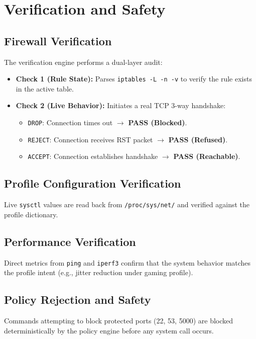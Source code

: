 \documentclass[11pt,a4paper]{article}
\begin{document}
\section{Verification and Safety}

\subsection{Firewall Verification}
The verification engine performs a dual-layer audit:
\begin{itemize}
    \item \textbf{Check 1 (Rule State):} Parses \texttt{iptables -L -n -v} to verify the rule exists in the active table.
    \item \textbf{Check 2 (Live Behavior):} Initiates a real TCP 3-way handshake:
    \begin{itemize}
        \item \texttt{DROP}: Connection times out $\rightarrow$ \textbf{PASS (Blocked)}.
        \item \texttt{REJECT}: Connection receives RST packet $\rightarrow$ \textbf{PASS (Refused)}.
        \item \texttt{ACCEPT}: Connection establishes handshake $\rightarrow$ \textbf{PASS (Reachable)}.
    \end{itemize}
\end{itemize}

\subsection{Profile Configuration Verification}
Live \texttt{sysctl} values are read back from \texttt{/proc/sys/net/} and verified against the profile dictionary.

\subsection{Performance Verification}
Direct metrics from \texttt{ping} and \texttt{iperf3} confirm that the system behavior matches the profile intent (e.g., jitter reduction under gaming profile).

\subsection{Policy Rejection and Safety}
Commands attempting to block protected ports (22, 53, 5000) are blocked deterministically by the policy engine before any system call occurs.
\end{document}
